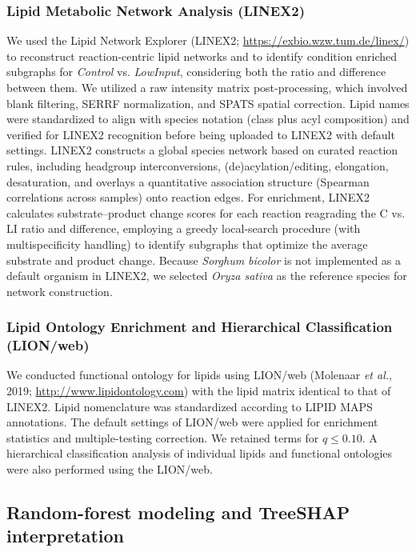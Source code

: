 \documentclass[10pt,letterpaper]{article}
\begin{document}
\subsubsection*{Lipid Metabolic Network Analysis (LINEX2)}

We used the Lipid Network Explorer (LINEX2; \url{https://exbio.wzw.tum.de/linex/}) to reconstruct reaction-centric lipid networks and to identify condition enriched subgraphs for \textit{Control} vs. \textit{LowInput}, considering both the ratio and difference between them. We utilized a raw intensity matrix post-processing, which involved blank filtering, SERRF normalization, and SPATS spatial correction. Lipid names were standardized to align with species notation (class plus acyl composition) and verified for LINEX2 recognition before being uploaded to LINEX2 with default settings. LINEX2 constructs a global species network based on curated reaction rules, including headgroup interconversions, (de)acylation/editing, elongation, desaturation, and overlays a quantitative association structure (Spearman correlations across samples) onto reaction edges. For enrichment, LINEX2 calculates substrate–product change scores for each reaction reagrading the C vs. LI ratio and difference, employing a greedy local-search procedure (with multispecificity handling) to identify subgraphs that optimize the average substrate and product change. Because \textit{Sorghum bicolor} is not implemented as a default organism in LINEX2, we selected \textit{Oryza sativa} as the reference species for network construction.


\subsubsection*{Lipid Ontology Enrichment and Hierarchical Classification (LION/web)}
We conducted functional ontology for lipids using LION/web (Molenaar \emph{et al.}, 2019; \url{http://www.lipidontology.com}) with the lipid matrix identical to that of LINEX2. Lipid nomenclature was standardized according to LIPID MAPS annotations. The default settings of LION/web were applied for enrichment statistics and multiple-testing correction. We retained terms for $q \leq 0.10$. A hierarchical classification analysis of individual lipids and functional ontologies were also performed using the LION/web.


\subsection*{Random-forest modeling and TreeSHAP interpretation}
\end{document}
